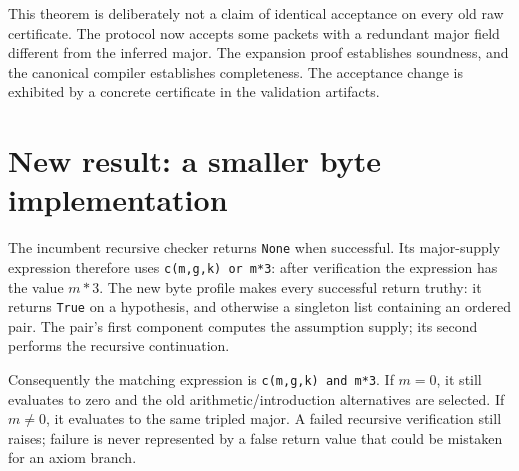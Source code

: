 This theorem is deliberately not a claim of identical acceptance on every
old raw certificate. The protocol now accepts some packets with a
redundant major field different from the inferred major. The expansion
proof establishes soundness, and the canonical compiler establishes
completeness. The acceptance change is exhibited by a concrete certificate
in the validation artifacts.

\section{New result: a smaller byte implementation}
\label{sec:byte-proof}

The incumbent recursive checker returns \texttt{None} when successful.
Its major-supply expression therefore uses
\texttt{c(m,g,k) or m*3}: after verification the expression has the value
$m*3$. The new byte profile makes every successful return truthy:
it returns \texttt{True} on a hypothesis, and otherwise a singleton list
containing an ordered pair. The pair's first component computes the
assumption supply; its second performs the recursive continuation.

Consequently the matching expression is
\texttt{c(m,g,k) and m*3}. If $m=0$, it still evaluates to zero and the
old arithmetic/introduction alternatives are selected. If $m\ne0$, it
evaluates to the same tripled major. A failed recursive verification still
raises; failure is never represented by a false return value that could
be mistaken for an axiom branch.

